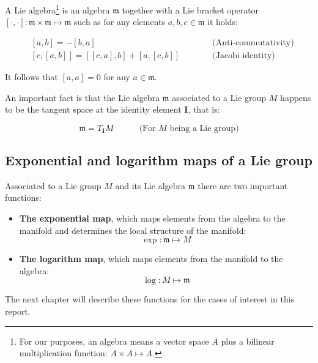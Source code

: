 \documentclass[a4paper,11pt]{report}
\begin{document}
A Lie algebra\footnote{For our purposes, an algebra means a vector space $A$ plus
a bilinear multiplication function: $A \times A \mapsto A$.}
is an algebra $\mathfrak{m}$ together with a Lie bracket operator
$[\cdot,\cdot]: \mathfrak{m} \times \mathfrak{m} \mapsto \mathfrak{m}$
such as for any elements $a,b,c \in \mathfrak{m}$
it holds:

\begin{eqnarray}
 & [a,b] = -[b,a]   & \quad\quad\quad \text{(Anti-commutativity)} \\
 & \left[ c, \left[a,b \right] \right] =
\left[ \left[c,a\right] , b \right] +
\left[ a,\left[c,b\right] \right]  &  \quad\quad\quad \text{(Jacobi identity)}
\end{eqnarray}

It follows that $[a,a]=0$ for any $a \in \mathfrak{m}$.

An important fact is that the Lie algebra $\mathfrak{m}$
associated to a Lie group $M$ happens to be the tangent
space at the identity element $\mathbf{I}$, that is:

\begin{equation}
 \mathfrak{m} = T_\mathbf{I} M   \quad\quad\quad\text{(For $M$ being a Lie group)}
\end{equation}



\subsection{Exponential and logarithm maps of a Lie group}
\label{sect:exp_ln}

Associated to a Lie group $M$ and its
Lie algebra $\mathfrak{m}$ there are
two important functions:

\begin{itemize}
\item{\textbf{The exponential map}, which maps elements from
the algebra to the manifold and determines the local structure
of the manifold:
\begin{equation}
 \exp: \mathfrak{m}  \mapsto M
\end{equation}
}
\item{\textbf{The logarithm map}, which maps elements from
the manifold to the algebra:
\begin{equation}
 \log: M  \mapsto \mathfrak{m}
\end{equation}
}
\end{itemize}

The next chapter will describe these functions for
the cases of interest in this report.
\end{document}

